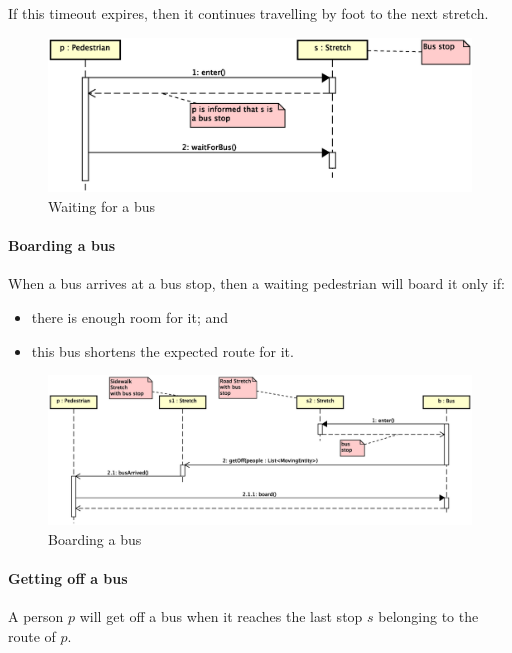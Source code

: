 If this timeout expires,
then it continues travelling by foot to the next stretch.

\begin{figure}[H]
  \centering
  \includegraphics[width=\columnwidth,trim=1 0 2 0,clip]
    {images/solution/bus_waiting.eps}
  \caption{Waiting for a bus}
  \label{fig:app-inter-wait-bus}
\end{figure}

\paragraph{Boarding a bus} When a bus arrives at a bus stop, then a waiting
pedestrian will board it only if:

\begin{itemize}
  \item there is enough room for it; and
  \item this bus shortens the expected route for it.
\end{itemize}

\begin{figure}[H]
  \centering
  \includegraphics[width=\columnwidth,trim=1 0 0 0,clip]
    {images/solution/bus_boarding.eps}
  \caption{Boarding a bus}
  \label{fig:app-inter-board-bus}
\end{figure}

\paragraph{Getting off a bus} A person $p$ will get off a bus when it reaches
the last stop $s$ belonging to the route of $p$.

